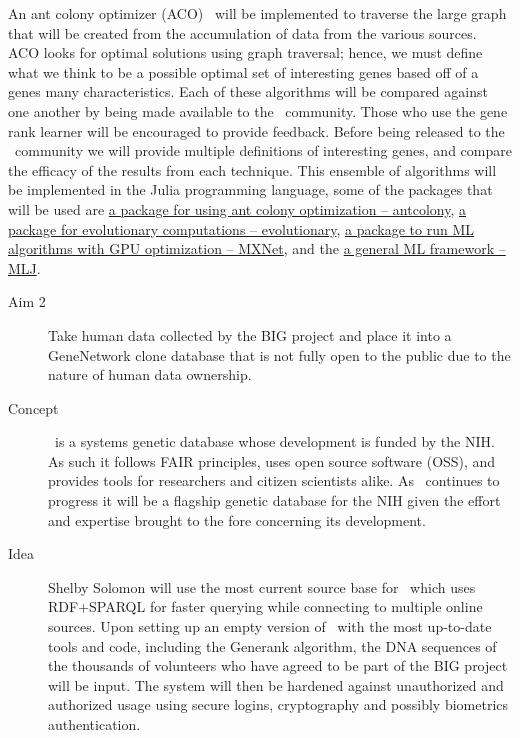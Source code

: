\begin{description}
An ant colony optimizer (ACO)~\cite{ACO:2009} will be implemented to traverse the large graph that will be created from the accumulation of data from the various sources.
ACO looks for optimal solutions using graph traversal; hence, we must define what we think to be a possible optimal set of interesting genes based off of a genes many characteristics.
Each of these algorithms will be compared against one another by being made available to the \GN\ community.
Those who use the gene rank learner will be encouraged to provide feedback.
Before being released to the \GN\ community we will provide multiple definitions of interesting genes, and compare the efficacy of the results from each technique.
This ensemble of algorithms will be implemented in the Julia programming language, some of the packages that will be used are \hyperlink{https://www.juliapackages.com/p/antcolony}{a package for using ant colony optimization -- antcolony}, \hyperlink{https://juliapackages.com/p/evolutionary}{a package for evolutionary computations -- evolutionary}, \hyperlink{https://juliapackages.com/p/mxnet}{a package to run ML algorithms with GPU optimization -- MXNet}, and the \hyperlink{https://alan-turing-institute.github.io/MLJ.jl/dev/}{a general ML framework -- MLJ}.
\end{description}

\begin{description}
	\item[Aim 2] Take human data collected by the BIG project and place it into a GeneNetwork clone database that is not fully open to the public due to the nature of human data ownership.
	\item[Concept] \GN\ is a systems genetic database whose development is funded by the NIH. As such it follows FAIR principles, uses open source software (OSS), and provides tools for researchers and citizen scientists alike. As \GN\ continues to progress it will be a flagship genetic database for the NIH given the effort and expertise brought to the fore concerning its development.
	\item[Idea] Shelby Solomon will use the most current source base for \GN\ which uses RDF+SPARQL for faster querying while connecting to multiple online sources. Upon setting up an empty version of \GN\ with the most up-to-date tools and code, including the Generank algorithm, the DNA sequences of the thousands of volunteers who have agreed to be part of the BIG project will be input. The system will then be hardened against unauthorized and authorized usage using secure logins, cryptography and possibly biometrics authentication.
\end{description}

